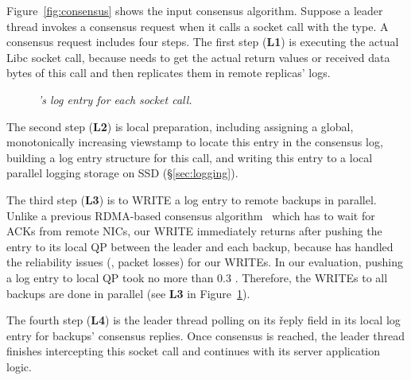Figure~\ref{fig:consensus} shows the input consensus algorithm. Suppose a 
leader thread invokes a consensus request when it calls a socket call with the 
\recv type. A consensus request includes four steps. The first step 
(\textbf{L1}) is executing the actual Libc socket call, because \xxx needs to 
get the actual return values or received data bytes of this call and then 
replicates them in remote replicas' logs.

\begin{figure}[t]
\centering
\begin{minipage}{.5\textwidth}
\end{minipage}
\vspace{-.05in}
\caption{{\em \xxx's log entry for each socket call.}} \label{fig:logentry}
\vspace{-.2in}
\end{figure}

The second step (\textbf{L2}) is local preparation, including assigning a 
global, monotonically increasing viewstamp to locate this entry in the 
consensus log, building a log entry structure for this call, and writing this 
entry to a local parallel logging storage on SSD (\S\ref{sec:logging}).

The third step (\textbf{L3}) is to WRITE a log entry to remote backups 
in parallel. Unlike a previous RDMA-based consensus 
algorithm~\cite{dare:hpdc15} which has to wait for ACKs from remote NICs, our 
WRITE immediately returns after pushing the entry to its local QP between the 
leader and each backup, because \paxos has handled the reliability issues (\eg, 
packet losses) for our WRITEs. In our evaluation, pushing a log entry to local 
QP took no more than 0.3 \us. Therefore, the WRITEs to all backups are done in 
parallel (see \textbf{L3} in Figure~\ref{fig:logentry}).




The fourth step (\textbf{L4}) is the leader thread polling on its \v{reply} 
field in its local log entry for backups' consensus replies. Once consensus is 
reached, the leader thread finishes intercepting this \recv socket call and 
continues with its server application logic.

